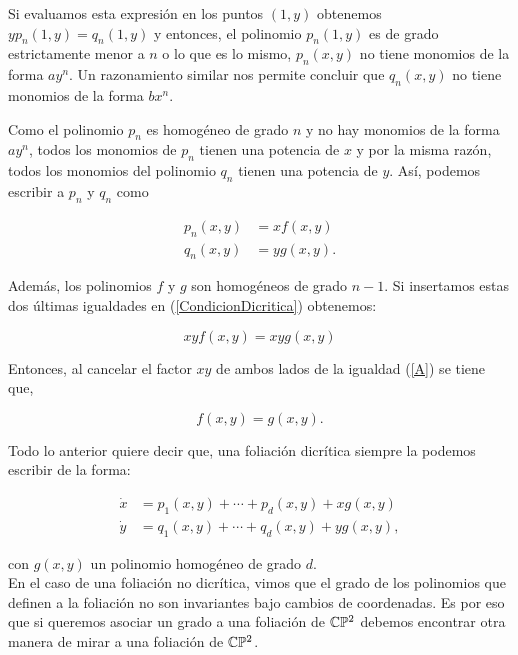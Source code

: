 Si evaluamos esta expresión en los puntos $(1,y)$ obtenemos $yp_{n}(1,y)=q_{n}(1,y)$ y entonces, el polinomio $p_{n}(1,y)$ es de grado estrictamente menor a $n$ o lo que es lo mismo, $p_{n}(x,y)$ no tiene monomios de la forma $ay^{n}$. Un razonamiento similar nos permite concluir que $q_{n}(x,y)$ no tiene monomios de la forma $bx^{n}$.

Como el polinomio $p_{n}$ es homogéneo de grado $n$ y no hay monomios de la forma $ay^{n}$, todos los monomios de $p_{n}$ tienen una potencia de $x$ y por la misma razón, todos los monomios del polinomio $q_{n}$ tienen una potencia de $y$. Así, podemos escribir a $p_{n}$ y $q_{n}$ como

\begin{equation}
\begin{aligned}
p_{n}(x,y) &=xf(x,y)\\
q_{n}(x,y) &=yg(x,y).
\end{aligned}
\end{equation}

 \noindent Además, los polinomios $f$ y $g$ son homogéneos de grado $n-1$. Si insertamos estas dos últimas igualdades en (\ref{CondicionDicritica}) obtenemos:

\begin{equation}
\label{A}
xyf(x,y)=xyg(x,y)
\end{equation}

\noindent Entonces, al cancelar el factor $xy$ de ambos lados de la igualdad (\ref{A}) se tiene que,

\begin{equation}
f(x,y)=g(x,y).
\end{equation}

Todo lo anterior quiere decir que, una foliación dicrítica siempre la podemos escribir de la forma:

\begin{equation}
\label{EcuacionDicritica}
\begin{aligned}
\dot{x} &=p_{1}(x,y)+\cdots+p_{d}(x,y)+xg(x,y)\\
\dot{y} &=q_{1}(x,y)+\cdots+q_{d}(x,y)+yg(x,y),
\end{aligned}
\end{equation}

\noindent con $g(x,y)$ un polinomio homogéneo de grado $d$.\\

En el caso de una foliación no dicrítica, vimos que el grado de los polinomios que definen a la foliación no son invariantes bajo cambios de coordenadas. Es por eso que si queremos asociar un grado a una foliación de $\mathbb{C}\mathbb{P}^{2}$ debemos encontrar otra manera de mirar a una foliación de $\mathbb{C}\mathbb{P}^{2}$.\\

